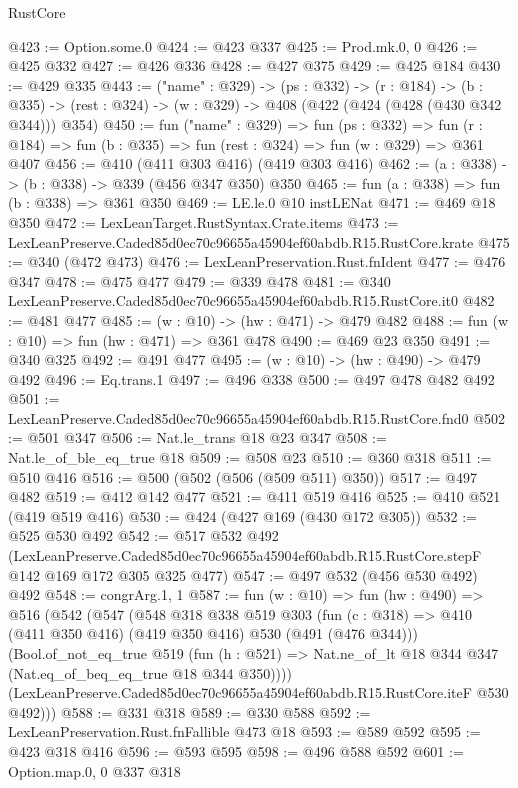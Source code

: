 \begin{lexlean}{RustCore}
\begin{coremodule}
@423 := Option.some.{0}
@424 := @423 @337
@425 := Prod.mk.{0, 0}
@426 := @425 @332
@427 := @426 @336
@428 := @427 @375
@429 := @425 @184
@430 := @429 @335
@443 := ("name" : @329) ->
  (ps : @332) ->
  (r : @184) ->
  (b : @335) -> (rest : @324) -> (w : @329) -> @408 (@422 (@424 (@428 (@430 @342 @344))) @354)
@450 := fun ("name" : @329) =>
  fun (ps : @332) =>
  fun (r : @184) => fun (b : @335) => fun (rest : @324) => fun (w : @329) => @361 @407
@456 := @410 (@411 @303 @416) (@419 @303 @416)
@462 := (a : @338) -> (b : @338) -> @339 (@456 @347 @350) @350
@465 := fun (a : @338) => fun (b : @338) => @361 @350
@469 := LE.le.{0} @10 instLENat
@471 := @469 @18 @350
@472 := LexLeanTarget.RustSyntax.Crate.items
@473 := LexLeanPreserve.Caded85d0ec70c96655a45904ef60abdb.R15.RustCore.krate
@475 := @340 (@472 @473)
@476 := LexLeanPreservation.Rust.fnIdent
@477 := @476 @347
@478 := @475 @477
@479 := @339 @478
@481 := @340 LexLeanPreserve.Caded85d0ec70c96655a45904ef60abdb.R15.RustCore.it0
@482 := @481 @477
@485 := (w : @10) -> (hw : @471) -> @479 @482
@488 := fun (w : @10) => fun (hw : @471) => @361 @478
@490 := @469 @23 @350
@491 := @340 @325
@492 := @491 @477
@495 := (w : @10) -> (hw : @490) -> @479 @492
@496 := Eq.trans.{1}
@497 := @496 @338
@500 := @497 @478 @482 @492
@501 := LexLeanPreserve.Caded85d0ec70c96655a45904ef60abdb.R15.RustCore.fnd0
@502 := @501 @347
@506 := Nat.le_trans @18 @23 @347
@508 := Nat.le_of_ble_eq_true @18
@509 := @508 @23
@510 := @360 @318
@511 := @510 @416
@516 := @500 (@502 (@506 (@509 @511) @350))
@517 := @497 @482
@519 := @412 @142 @477
@521 := @411 @519 @416
@525 := @410 @521 (@419 @519 @416)
@530 := @424 (@427 @169 (@430 @172 @305))
@532 := @525 @530 @492
@542 := @517
    @532
    @492
    (LexLeanPreserve.Caded85d0ec70c96655a45904ef60abdb.R15.RustCore.stepF
      @142
      @169
      @172
      @305
      @325
      @477)
@547 := @497 @532 (@456 @530 @492) @492
@548 := congrArg.{1, 1}
@587 := fun (w : @10) =>
  fun (hw : @490) =>
  @516
    (@542
      (@547
        (@548
          @318
          @338
          @519
          @303
          (fun (c : @318) => @410 (@411 @350 @416) (@419 @350 @416) @530 (@491 (@476 @344)))
          (Bool.of_not_eq_true
            @519
            (fun (h : @521) => Nat.ne_of_lt @18 @344 @347 (Nat.eq_of_beq_eq_true @18 @344 @350))))
        (LexLeanPreserve.Caded85d0ec70c96655a45904ef60abdb.R15.RustCore.iteF @530 @492)))
@588 := @331 @318
@589 := @330 @588
@592 := LexLeanPreservation.Rust.fnFallible @473 @18
@593 := @589 @592
@595 := @423 @318 @416
@596 := @593 @595
@598 := @496 @588 @592
@601 := Option.map.{0, 0} @337 @318

\end{coremodule}
\end{lexlean}
